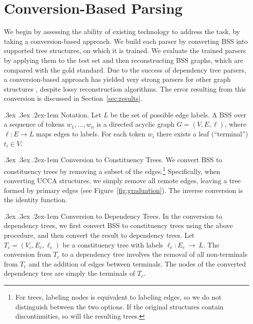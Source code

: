 \documentclass[11pt,letterpaper]{article}
\makeatletter
\newcommand{\secref}[1]{Section~\ref{#1}}
\newcommand{\figref}[1]{Figure~\ref{#1}}
\renewcommand{\paragraph}{
  \@startsection{paragraph}{4}
  {\z@}{.3ex \@plus .3ex \@minus .2ex}{-1em}
  {\normalfont\normalsize\bfseries}
}
\makeatother
\begin{document}
\section{Conversion-Based Parsing}\label{sec:conversion_approach}

We begin by assessing the ability of existing technology to address the task,
by taking a conversion-based approach.
We build each parser by converting BSS into supported tree structures,
on which it is trained.
We evaluate the trained parsers by applying them to the test set
and then reconstructing BSS graphs, which are compared with the gold standard.
Due to the success of dependency tree parsers, a conversion-based approach has yielded
very strong parsers for other graph structures
\cite{agic2015semantic,fernandez2015parsing}, despite lossy reconstruction algorithms.
The error resulting from this conversion is discussed in
\secref{sec:results}.

\paragraph{Notation.}
Let $L$ be the set of possible edge labels.
A BSS over a sequence of tokens $w_1, \ldots, w_n$ is a directed acyclic graph $G=(V,E, \ell)$,
where $\ell:E\to L$ maps edges to labels.
For each token $w_i$ there exists a leaf (``terminal'') $t_i \in V$.

\paragraph{Conversion to Constituency Trees.}
We convert BSS to constituency trees by removing a subset of the
edges.\footnote{For trees, labeling nodes is equivalent to labeling edges, so
  we do not distinguish between the two options.
  If the original structures contain discontinuities, so will the resulting trees.}
Specifically, when converting UCCA structures, we simply remove all remote edges,
leaving a tree formed by primary edges (see \figref{fig:graduation}).
The inverse conversion is the identity function.

\paragraph{Conversion to Dependency Trees.}\label{subsec:con2dep}
In the conversion to dependency trees, we first convert BSS
to constituency trees using the above procedure, and then convert the result to dependency trees. 
Let $T_c=(V_c,E_c,\ell_c)$ be a constituency tree with labels $\ell_c:E_c~\rightarrow~L$.
The conversion from $T_c$ to a dependency tree involves the removal of
all non-terminals from $T_c$ and the addition of edges between terminals.
The nodes of the converted dependency tree are simply the terminals of $T_c$.
\end{document}
